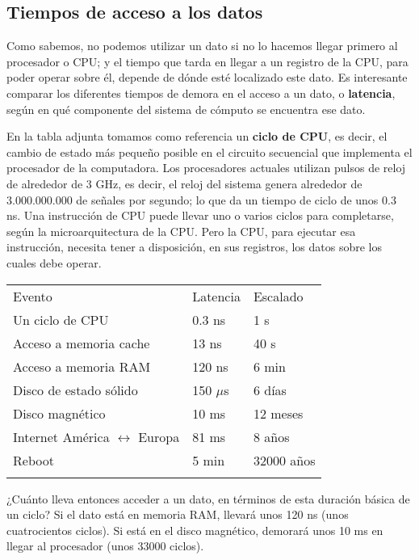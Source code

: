 \documentclass[spanish,A4,]{article}
\begin{document}
\subsection{Tiempos de acceso a los
datos}\label{tiempos-de-acceso-a-los-datos}

Como sabemos, no podemos utilizar un dato si no lo hacemos llegar
primero al procesador o CPU; y el tiempo que tarda en llegar a un
registro de la CPU, para poder operar sobre él, depende de dónde esté
localizado este dato. Es interesante comparar los diferentes tiempos de
demora en el acceso a un dato, o \textbf{latencia}, según en qué
componente del sistema de cómputo se encuentra ese dato.

En la tabla adjunta tomamos como referencia un \textbf{ciclo de CPU}, es
decir, el cambio de estado más pequeño posible en el circuito secuencial
que implementa el procesador de la computadora. Los procesadores
actuales utilizan pulsos de reloj de alrededor de 3 GHz, es decir, el
reloj del sistema genera alrededor de 3.000.000.000 de señales por
segundo; lo que da un tiempo de ciclo de unos 0.3 ns. Una instrucción de
CPU puede llevar uno o varios ciclos para completarse, según la
microarquitectura de la CPU. Pero la CPU, para ejecutar esa instrucción,
necesita tener a disposición, en sus registros, los datos sobre los
cuales debe operar.

\begin{longtable}[c]{@{}lll@{}}
\toprule\addlinespace
Evento & Latencia & Escalado
\\\addlinespace
\midrule\endhead
Un ciclo de CPU & 0.3 ns & 1 s
\\\addlinespace
Acceso a memoria cache & 13 ns & 40 s
\\\addlinespace
Acceso a memoria RAM & 120 ns & 6 min
\\\addlinespace
Disco de estado sólido & 150 $\mu$s & 6 días
\\\addlinespace
Disco magnético & 10 ms & 12 meses
\\\addlinespace
Internet América $\longleftrightarrow$ Europa & 81 ms & 8 años
\\\addlinespace
Reboot & 5 min & 32000 años
\\\addlinespace
\bottomrule
\end{longtable}

¿Cuánto lleva entonces acceder a un dato, en términos de esta duración
básica de un ciclo? Si el dato está en memoria RAM, llevará unos 120 ns
(unos cuatrocientos ciclos). Si está en el disco magnético, demorará
unos 10 ms en llegar al procesador (unos 33000 ciclos).
\end{document}
